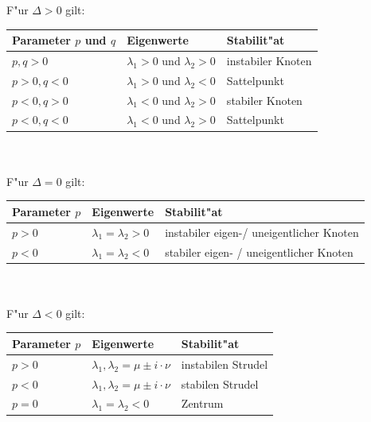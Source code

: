 \begin{minipage}[h]{0.35\textwidth}
	F"ur $\Delta > 0$ gilt:\\
	\begin{tabular}{|l|l|l|}
		\hline
		\textbf{Parameter $p$ und $q$} & \textbf{Eigenwerte}               & \textbf{Stabilit"at} \\ \hline
		$p,q > 0$                      & $\lambda_1 >0$ und $\lambda_2 >0$ & instabiler Knoten                        \\ \hline
		$p>0 ,  q<0$                   & $\lambda_1 >0$ und $\lambda_2 <0$ & Sattelpunkt                              \\ \hline
		$p< 0, q>0$                    & $\lambda_1 <0$ und $\lambda_2 >0$ & stabiler Knoten                          \\ \hline
		$p<0, q<0$                     & $\lambda_1 <0$ und $\lambda_2 >0$ & Sattelpunkt                              \\ \hline
	\end{tabular} \\ \\
	
	F"ur $\Delta = 0$ gilt:\\
	\begin{tabular}{|l|l|l|}
		\hline
		\textbf{Parameter $p$} & \textbf{Eigenwerte}        & \textbf{Stabilit"at}                         \\ \hline
		$p> 0$                         & $\lambda_1 = \lambda_2 >0$ & instabiler eigen-/ uneigentlicher Knoten \\ \hline
		$p< 0$                         & $\lambda_1 = \lambda_2 <0$ & stabiler eigen- / uneigentlicher Knoten   \\ \hline
	\end{tabular}\\ \\
	
	F"ur $\Delta < 0$ gilt:\\
		\begin{tabular}{|l|l|l|}
			\hline
			\textbf{Parameter $p$} & \textbf{Eigenwerte}                           & \textbf{Stabilit"at} \\ \hline
			$p> 0$                         & $\lambda_1 , \lambda_2 = \mu \pm i \cdot \nu$ & instabilen Strudel   \\ \hline
			$p< 0$                         & $\lambda_1 , \lambda_2 = \mu \pm i \cdot \nu$ & stabilen Strudel     \\ \hline
			$p= 0$                         & $\lambda_1 = \lambda_2 <0$                    & Zentrum              \\ \hline
		\end{tabular}  
\end{minipage}


